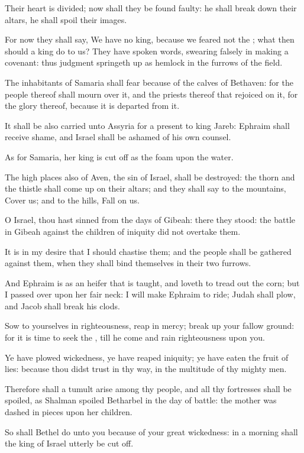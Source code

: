 \Verse Their heart is divided; now shall they be found faulty: he shall break down their altars, he shall spoil their images.

\Verse For now they shall say, We have no king, because we feared not the \LORD; what then should a king do to us?  \Verse They have spoken words, swearing falsely in making a covenant: thus judgment springeth up as hemlock in the furrows of the field.

\Verse The inhabitants of Samaria shall fear because of the calves of Bethaven: for the people thereof shall mourn over it, and the priests thereof that rejoiced on it, for the glory thereof, because it is departed from it.

\Verse It shall be also carried unto Assyria for a present to king Jareb: Ephraim shall receive shame, and Israel shall be ashamed of his own counsel.

\Verse As for Samaria, her king is cut off as the foam upon the water.

\Verse The high places also of Aven, the sin of Israel, shall be destroyed: the thorn and the thistle shall come up on their altars; and they shall say to the mountains, Cover us; and to the hills, Fall on us.

\Verse O Israel, thou hast sinned from the days of Gibeah: there they stood: the battle in Gibeah against the children of iniquity did not overtake them.

\Verse It is in my desire that I should chastise them; and the people shall be gathered against them, when they shall bind themselves in their two furrows.

\Verse And Ephraim is as an heifer that is taught, and loveth to tread out the corn; but I passed over upon her fair neck: I will make Ephraim to ride; Judah shall plow, and Jacob shall break his clods.

\Verse Sow to yourselves in righteousness, reap in mercy; break up your fallow ground: for it is time to seek the \LORD, till he come and rain righteousness upon you.

\Verse Ye have plowed wickedness, ye have reaped iniquity; ye have eaten the fruit of lies: because thou didst trust in thy way, in the multitude of thy mighty men.

\Verse Therefore shall a tumult arise among thy people, and all thy fortresses shall be spoiled, as Shalman spoiled Betharbel in the day of battle: the mother was dashed in pieces upon her children.

\Verse So shall Bethel do unto you because of your great wickedness: in a morning shall the king of Israel utterly be cut off.


